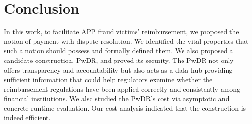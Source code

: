 
 \vspace{-2mm}
\section{Conclusion}\label{sec::conclusion}



In this work, to facilitate APP fraud victims’ reimbursement,  we proposed the notion of payment with dispute resolution. We identified the vital properties that such a notion should possess and formally defined them. We also proposed a candidate construction,  PwDR, and proved its security.  The PwDR not only offers transparency and accountability but also acts as a data hub providing sufficient information that could help regulators examine whether the reimbursement regulations have been applied correctly and consistently among financial institutions.  We also studied the PwDR's cost via asymptotic and concrete runtime evaluation. Our cost analysis indicated that the construction is indeed efficient. 

 \vspace{-2mm}




